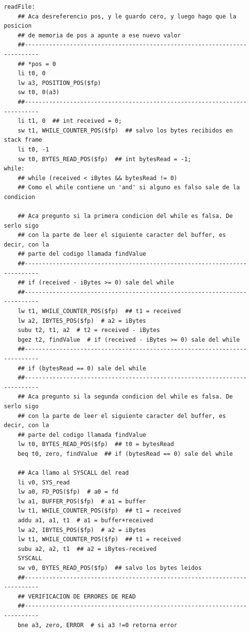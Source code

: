 \documentclass[a4paper,10pt]{article}
\begin{document}
\begin{lstlisting}
readFile:
    ## Aca desreferencio pos, y le guardo cero, y luego hago que la posicion
    ## de memoria de pos a apunte a ese nuevo valor
    ##--------------------------------------------------------------------------
    ## *pos = 0
    li t0, 0
    lw a3, POSITION_POS($fp)
    sw t0, 0(a3)
    ##--------------------------------------------------------------------------
    li t1, 0  ## int received = 0;
    sw t1, WHILE_COUNTER_POS($fp)  ## salvo los bytes recibidos en stack frame
    li t0, -1
    sw t0, BYTES_READ_POS($fp)  ## int bytesRead = -1;
while:
    ## while (received < iBytes && bytesRead != 0)
    ## Como el while contiene un 'and' si alguno es falso sale de la condicion

    ## Aca pregunto si la primera condicion del while es falsa. De serlo sigo
    ## con la parte de leer el siguiente caracter del buffer, es decir, con la
    ## parte del codigo llamada findValue
    ##--------------------------------------------------------------------------
    ## if (received - iBytes >= 0) sale del while
    ##--------------------------------------------------------------------------
    lw t1, WHILE_COUNTER_POS($fp)  ## t1 = received
    lw a2, IBYTES_POS($fp)  # a2 = iBytes
    subu t2, t1, a2  # t2 = received - iBytes
    bgez t2, findValue  # if (received - iBytes >= 0) sale del while
    ##--------------------------------------------------------------------------
    ## if (bytesRead == 0) sale del while
    ##--------------------------------------------------------------------------
    ## Aca pregunto si la segunda condicion del while es falsa. De serlo sigo
    ## con la parte de leer el siguiente caracter del buffer, es decir, con la
    ## parte del codigo llamada findValue
    lw t0, BYTES_READ_POS($fp)  ## t0 = bytesRead
    beq t0, zero, findValue  ## if (bytesRead == 0) sale del while

    ## Aca llamo al SYSCALL del read
    li v0, SYS_read
    lw a0, FD_POS($fp)  # a0 = fd
    lw a1, BUFFER_POS($fp)  # a1 = buffer
    lw t1, WHILE_COUNTER_POS($fp)  ## t1 = received
    addu a1, a1, t1  # a1 = buffer+received
    lw a2, IBYTES_POS($fp)  # a2 = iBytes
    lw t1, WHILE_COUNTER_POS($fp)  ## t1 = received
    subu a2, a2, t1  ## a2 = iBytes-received
    SYSCALL
    sw v0, BYTES_READ_POS($fp)  ## salvo los bytes leidos
    ##--------------------------------------------------------------------------
    ## VERIFICACION DE ERRORES DE READ
    ##--------------------------------------------------------------------------
    bne a3, zero, ERROR  # si a3 !=0 retorna error


\end{lstlisting}
\end{document}
